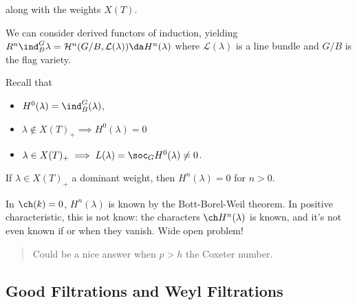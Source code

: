 \begin{center}\end{center}

along with the weights \(X(T)\).

We can consider derived functors of induction, yielding
\(R^n \ind_B^G \lambda = \mathcal{H}^n(G/B, \mathcal{L}(\lambda)) \da H^n(\lambda)\)
where \(\mathcal{L}(\lambda)\) is a line bundle and \(G/B\) is the flag
variety.

Recall that

\begin{itemize}
\tightlist
\item
  \(H^0(\lambda) = \ind_B^G(\lambda)\),
\item
  \(\lambda \not\in X(T)_+ \implies H^0(\lambda) = 0\)
\item
  \(\lambda \in X(T)_+ \implies L(\lambda) = \soc_G H^0(\lambda) \neq 0\).
\end{itemize}

\begin{theorem}[Kempf]

If \(\lambda \in X(T)_+\) a dominant weight, then \(H^n(\lambda) = 0\)
for \(n> 0\).

\end{theorem}

\begin{remark}

In \(\ch(k) = 0\), \(H^n(\lambda)\) is known by the Bott-Borel-Weil
theorem. In positive characteristic, this is not know: the characters
\(\ch H^n (\lambda)\) is known, and it's not even known if or when they
vanish. Wide open problem!

\begin{quote}
Could be a nice answer when \(p>h\) the Coxeter number.
\end{quote}

\end{remark}

\hypertarget{good-filtrations-and-weyl-filtrations}{%
\subsection{Good Filtrations and Weyl
Filtrations}\label{good-filtrations-and-weyl-filtrations}}

